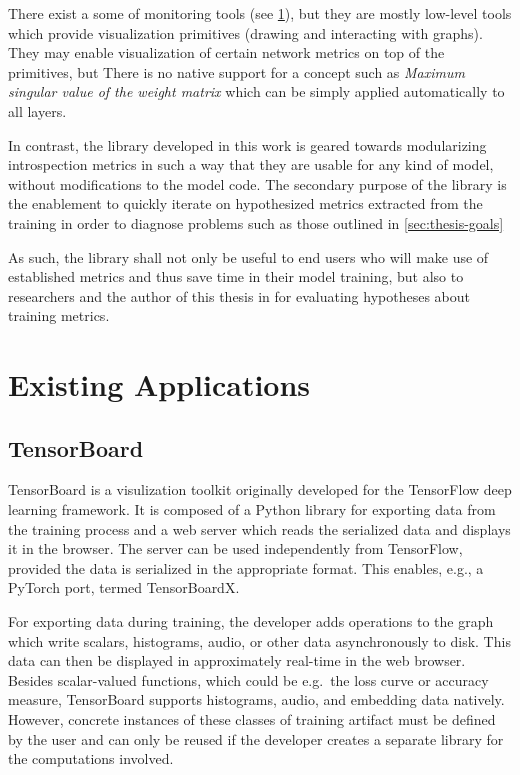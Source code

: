     There exist a some of monitoring tools (see \cref{sec:existing-apps}),
    but they are mostly low-level tools which provide visualization
    primitives (drawing and interacting with graphs). They may enable
    visualization of certain network metrics on top of the primitives, but
    There is no native support for a concept such as \emph{Maximum singular
    value of the weight matrix} which can be simply applied automatically to
    all layers.

    In contrast, the library developed in this work is geared towards
    modularizing introspection metrics in such a way that they are usable
    for any kind of model, without modifications to the model code. The
    secondary purpose of the library is the enablement to quickly iterate on
    hypothesized metrics extracted from the training in order to diagnose
    problems such as those outlined in \cref{sec:thesis-goals}

    As such, the library shall not only be useful to end users who will make
    use of established metrics and thus save time in their model training,
    but also to researchers and the author of this thesis in for evaluating
    hypotheses about training metrics.

    \hypertarget{sec:existing-apps}{%
    \section{Existing Applications}\label{sec:existing-apps}}

    \hypertarget{tensorboard}{%
    \subsection*{TensorBoard}\label{tensorboard}}

    TensorBoard is a visulization toolkit originally developed for the TensorFlow \citep{tensorflow2015-whitepaper} deep
    learning framework. It is composed of a Python library for exporting data from the training process and a web server
    which reads the serialized data and displays it in the browser. The server can be used independently from
    TensorFlow, provided the data is serialized in the appropriate format. This enables, e.g., a PyTorch port, termed
    TensorBoardX.

    For exporting data during training, the developer adds operations to the
    graph which write scalars, histograms, audio, or other data
    asynchronously to disk. This data can then be displayed in approximately
    real-time in the web browser. Besides scalar-valued functions, which
    could be e.g.~the loss curve or accuracy measure, TensorBoard supports
    histograms, audio, and embedding data natively. However, concrete
    instances of these classes of training artifact must be defined by the
    user and can only be reused if the developer creates a separate library
    for the computations involved.

